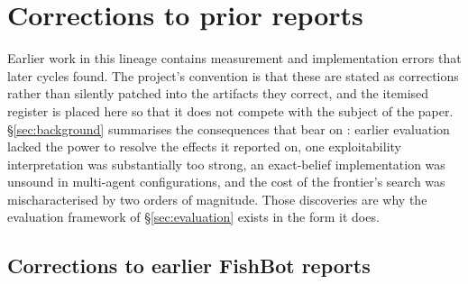 \section{Corrections to prior reports}
\label{app:corrections}

Earlier work in this lineage contains measurement and implementation errors that later cycles found.
The project's convention is that these are stated as corrections rather than silently patched into the
artifacts they correct, and the itemised register is placed here so that it does not compete with the
subject of the paper. \S\ref{sec:background} summarises the consequences that bear on
\sestina{}: earlier evaluation lacked the power to resolve the effects it reported on, one
exploitability interpretation was substantially too strong, an exact-belief implementation was unsound
in multi-agent configurations, and the cost of the frontier's search was mischaracterised by two
orders of magnitude. Those discoveries are why the evaluation framework of \S\ref{sec:evaluation}
exists in the form it does.

\subsection{Corrections to earlier FishBot reports}
\label{app:corrections-corpus}


